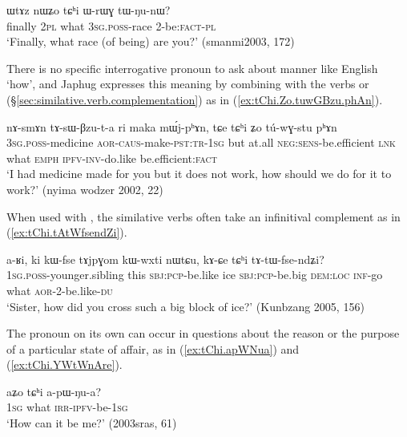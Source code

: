 \begin{exe}
\ex \label{ex:tChi.WrWG}
\gll ɯtɤz nɯʑo tɕʰi ɯ-rɯɣ tɯ-ŋu-nɯ? \\
finally \textsc{2pl} what  \textsc{3sg}.\textsc{poss}-race  2-be:\textsc{fact}-\textsc{pl} \\
\glt `Finally, what race (of being) are you?' (smanmi2003, 172)
\end{exe}  

There is no specific interrogative pronoun to ask about manner like English `how', and Japhug expresses this meaning by combining  with the verbs  or  (§\ref{sec:similative.verb.complementation}) as in (\ref{ex:tChi.Zo.tuwGBzu.phAn}).


\begin{exe}
\ex \label{ex:tChi.Zo.tuwGBzu.phAn}
\gll nɤ-smɤn tɤ-sɯ-βzu-t-a ri maka mɯ́j-pʰɤn, tɕe tɕʰi ʑo tú-wɣ-stu pʰɤn \\
\textsc{3sg}.\textsc{poss}-medicine \textsc{aor}-\textsc{caus}-make-\textsc{pst}:\textsc{tr}-\textsc{1sg} but at.all \textsc{neg}:\textsc{sens}-be.efficient \textsc{lnk} what \textsc{emph} \textsc{ipfv}-\textsc{inv}-do.like be.efficient:\textsc{fact} \\
\glt `I had medicine made for you but it does not work, how should we do for it to work?' (nyima wodzer 2002, 22) 
\end{exe}  

When used with , the similative verbs often take an infinitival complement as in (\ref{ex:tChi.tAtWfsendZi}).

\begin{exe}
\ex \label{ex:tChi.tAtWfsendZi}
\gll a-ʁi, ki kɯ-fse tɤjpɣom kɯ-wxti nɯtɕu, kɤ-ɕe tɕʰi tɤ-tɯ-fse-ndʑi? \\
\textsc{1sg}.\textsc{poss}-younger.sibling this \textsc{sbj}:\textsc{pcp}-be.like ice \textsc{sbj}:\textsc{pcp}-be.big \textsc{dem}:\textsc{loc} \textsc{inf}-go what \textsc{aor}-2-be.like-\textsc{du} \\
\glt `Sister, how did you cross such a big block of ice?' (Kunbzang 2005, 156)
\end{exe}  
 
The pronoun  on its own can occur in questions about the reason or the purpose of a particular state of affair, as in (\ref{ex:tChi.apWNua}) and (\ref{ex:tChi.YWtWnAre}).

\begin{exe}
\ex \label{ex:tChi.apWNua}
\gll  aʑo tɕʰi a-pɯ-ŋu-a? \\
\textsc{1sg} what \textsc{irr}-\textsc{ipfv}-be-\textsc{1sg} \\
\glt `How can it be me?' (2003sras, 61)
\end{exe}  

